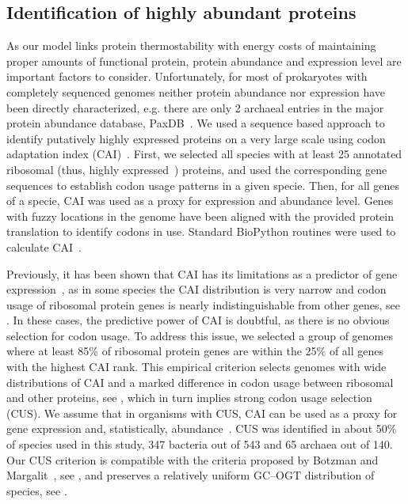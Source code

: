 \documentclass[10pt,letterpaper]{article}
\begin{document}
\subsection*{Identification of highly abundant proteins}
As our model links protein thermostability with energy costs of maintaining proper amounts of functional protein, protein abundance and expression level are important factors to consider. Unfortunately, for most of prokaryotes with completely sequenced genomes neither protein abundance nor expression have been directly characterized, e.g. there are only 2 archaeal entries in the major protein abundance database, PaxDB~\cite{Wang2015Version}. We used a sequence based approach to identify putatively highly expressed proteins on a very large scale using codon adaptation index (CAI)~\cite{Sharp1987The}.  First, we selected all species with at least 25 annotated ribosomal (thus, highly expressed~\cite{Pedersen1978Patterns,Srivastava1990Mechanism}) proteins, and used the corresponding gene sequences to establish codon usage patterns in a given specie. Then, for all genes of a specie, CAI was used as a proxy for expression and abundance level. Genes with fuzzy locations in the genome have been aligned with the provided protein translation to identify codons in use. Standard BioPython routines were used to calculate CAI~\cite{Cock2009Biopython}. 

Previously, it has been shown that CAI has its limitations as a predictor of gene expression~\cite{Botzman2011Variation}, as in some species the CAI distribution is very narrow and codon usage of ribosomal protein genes is nearly indistinguishable from other genes, see . In these cases, the predictive power of CAI is doubtful, as there is no obvious selection for codon usage. To address this issue, we selected a group of genomes where at least 85\% of ribosomal protein genes are within the 25\% of all genes with the highest CAI rank. This empirical criterion selects genomes with wide distributions of CAI and a marked difference in codon usage between ribosomal and other proteins, see , which in turn implies strong codon usage selection (CUS). We assume that in organisms with CUS, CAI can be used as a proxy for gene expression and, statistically, abundance~\cite{Sharp1987The,Jansen2003Revisiting,Supek2005Comparison,Maier2009Correlation}. CUS was identified in about 50\% of species used in this study, 347 bacteria out of 543 and 65 archaea out of 140. Our CUS criterion is compatible with the criteria proposed by Botzman and Margalit~\cite{Botzman2011Variation}, see , and preserves a relatively uniform GC--OGT distribution of species, see .
\end{document}
